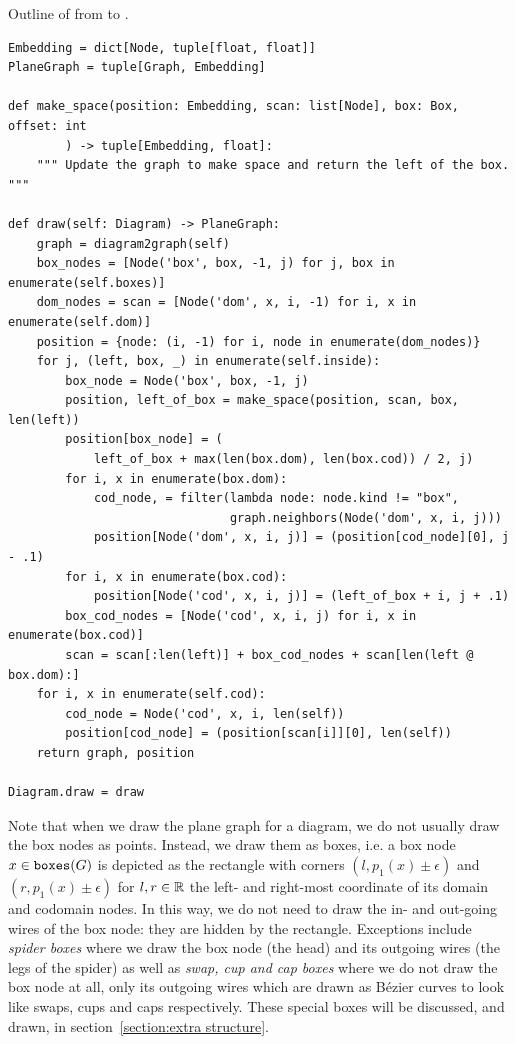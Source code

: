 \begin{python}
{\normalfont Outline of  from  to .}

\begin{verbatim}
Embedding = dict[Node, tuple[float, float]]
PlaneGraph = tuple[Graph, Embedding]

def make_space(position: Embedding, scan: list[Node], box: Box, offset: int
        ) -> tuple[Embedding, float]:
    """ Update the graph to make space and return the left of the box. """

def draw(self: Diagram) -> PlaneGraph:
    graph = diagram2graph(self)
    box_nodes = [Node('box', box, -1, j) for j, box in enumerate(self.boxes)]
    dom_nodes = scan = [Node('dom', x, i, -1) for i, x in enumerate(self.dom)]
    position = {node: (i, -1) for i, node in enumerate(dom_nodes)}
    for j, (left, box, _) in enumerate(self.inside):
        box_node = Node('box', box, -1, j)
        position, left_of_box = make_space(position, scan, box, len(left))
        position[box_node] = (
            left_of_box + max(len(box.dom), len(box.cod)) / 2, j)
        for i, x in enumerate(box.dom):
            cod_node, = filter(lambda node: node.kind != "box",
                               graph.neighbors(Node('dom', x, i, j)))
            position[Node('dom', x, i, j)] = (position[cod_node][0], j - .1)
        for i, x in enumerate(box.cod):
            position[Node('cod', x, i, j)] = (left_of_box + i, j + .1)
        box_cod_nodes = [Node('cod', x, i, j) for i, x in enumerate(box.cod)]
        scan = scan[:len(left)] + box_cod_nodes + scan[len(left @ box.dom):]
    for i, x in enumerate(self.cod):
        cod_node = Node('cod', x, i, len(self))
        position[cod_node] = (position[scan[i]][0], len(self))
    return graph, position

Diagram.draw = draw
\end{verbatim}
\end{python}

Note that when we draw the plane graph for a diagram, we do not usually draw the box nodes as points.
Instead, we draw them as boxes, i.e. a box node $x \in \mathtt{boxes}(G)$ is depicted as the rectangle with corners $(l, p_1(x) \pm \epsilon)$ and $(r, p_1(x) \pm \epsilon)$ for $l, r \in \mathbb{R}$ the left- and right-most coordinate of its domain and codomain nodes.
In this way, we do not need to draw the in- and out-going wires of the box node: they are hidden by the rectangle.
Exceptions include \emph{spider boxes} where we draw the box node (the head) and its outgoing wires (the legs of the spider) as well as \emph{swap, cup and cap boxes} where we do not draw the box node at all, only its outgoing wires which are drawn as Bézier curves to look like swaps, cups and caps respectively.
These special boxes will be discussed, and drawn, in section~\ref{section:extra structure}.

